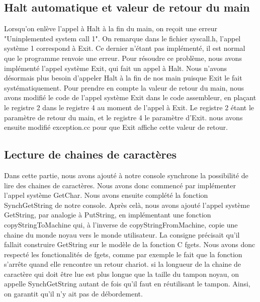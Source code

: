 \documentclass[12pt]{article}
\begin{document}
\bigbreak
\subsection{Halt automatique et valeur de retour du main}
Lorsqu'on enlève l'appel à \textcolor{blue2}{Halt} à la fin du main, on reçoit une erreur "Uninplemented system call 1". On remarque dans le fichier \textcolor{vert2}{syscall.h}, l'appel système 1 correspond à \textcolor{blue2}{Exit}.
\newline
Ce dernier n'étant pas implémenté, il est normal que le programme renvoie une erreur. Pour résoudre ce problème, nous avons implémenté l'appel système \textcolor{blue2}{Exit}, qui fait un appel à \textcolor{blue2}{Halt}. Nous n'avons désormais plus besoin d'appeler \textcolor{blue2}{Halt} à la fin de nos main puisque \textcolor{blue2}{Exit} le fait systématiquement.
\newline \newline
Pour prendre en compte la valeur de retour du main, nous avons modifié le code de l'appel système \textcolor{blue2}{Exit} dans le code assembleur, en plaçant le registre 2 dans le registre 4 au moment de l'appel à \textcolor{blue2}{Exit}. Le registre 2 étant le paramètre de retour du main, et le registre 4 le paramètre d'\textcolor{blue2}{Exit}. nous avons ensuite modifié exception.cc pour que \textcolor{blue2}{Exit} affiche cette valeur de retour.

\bigbreak
\subsection{Lecture de chaines de caractères}
Dans cette partie, nous avons ajouté à notre console synchrone la possibilité de lire des chaines de caractères. Nous avons donc commencé par implémenter l'appel système \textcolor{blue2}{GetChar}. Nous avons ensuite complété la fonction \textcolor{red2}{SynchGetString} de notre console. Après celà, nous avons ajouté l'appel système \textcolor{blue2}{GetString}, par analogie à \textcolor{blue2}{PutString}, en implémentant une fonction \textcolor{red2}{copyStringToMachine} qui, à l'inverse de \textcolor{red2}{copyStringFromMachine}, copie une chaine du monde noyau vers le monde utilisateur.
\newline \newline
La consigne précisait qu'il fallait construire \textcolor{blue2}{GetString} sur le modèle de la fonction C \textcolor{red2}{fgets}. Nous avons donc respecté les fonctionalités de \textcolor{red2}{fgets}, comme par exemple le fait que la fonction s'arrête quand elle rencontre un retour chariot. si la longueur de la chaine de caractère qui doit être lue est plus longue que la taille du tampon noyau, on appelle \textcolor{red2}{SynchGetString} autant de fois qu'il faut en réutilisant le tampon. Ainsi, on garantit qu'il n'y ait pas de débordement.
\end{document}

